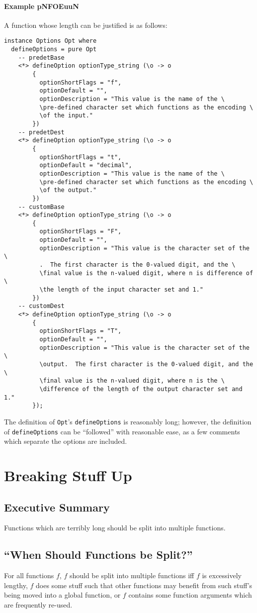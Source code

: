 \documentclass{report}
\begin{document}
\subsubsection{Example pNFOEuuN}
A function whose length can be justified is as follows:
\begin{lstlisting}
instance Options Opt where
  defineOptions = pure Opt
    -- predetBase
    <*> defineOption optionType_string (\o -> o
        {
          optionShortFlags = "f",
          optionDefault = "",
          optionDescription = "This value is the name of the \
          \pre-defined character set which functions as the encoding \
          \of the input."
        })
    -- predetDest
    <*> defineOption optionType_string (\o -> o
        {
          optionShortFlags = "t",
          optionDefault = "decimal",
          optionDescription = "This value is the name of the \
          \pre-defined character set which functions as the encoding \
          \of the output."
        })
    -- customBase
    <*> defineOption optionType_string (\o -> o
        {
          optionShortFlags = "F",
          optionDefault = "",
          optionDescription = "This value is the character set of the \
          .  The first character is the 0-valued digit, and the \
          \final value is the n-valued digit, where n is difference of \
          \the length of the input character set and 1."
        })
    -- customDest
    <*> defineOption optionType_string (\o -> o
        {
          optionShortFlags = "T",
          optionDefault = "",
          optionDescription = "This value is the character set of the \
          \output.  The first character is the 0-valued digit, and the \
          \final value is the n-valued digit, where n is the \
          \difference of the length of the output character set and 1."
        });
\end{lstlisting}
The definition of \texttt{Opt}'s \texttt{defineOptions} is reasonably long; however, the definition of \texttt{defineOptions} can be ``followed'' with reasonable ease, as a few comments which separate the options are included.
\chapter{Breaking Stuff Up}
\section{Executive Summary}
Functions which are terribly long should be split into multiple functions.
\section{``When Should Functions be Split?''}
For all functions $f$, $f$ should be split into multiple functions iff $f$ is excessively lengthy, $f$ does some stuff such that other functions may benefit from such stuff's being moved into a global function, or $f$ contains some function arguments which are frequently re-used.
\end{document}
